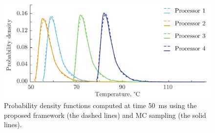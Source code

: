 \begin{figure}[b]
  \centering
  \vspace{-2.0em}
  \includegraphics[width=1\linewidth]{include/assets/experimental-results-pdf.pdf}
  \vspace{-2.0em}
  \caption{Probability density functions computed at time 50~ms using the proposed framework (the dashed lines) and MC sampling (the solid lines).}
\end{figure}
